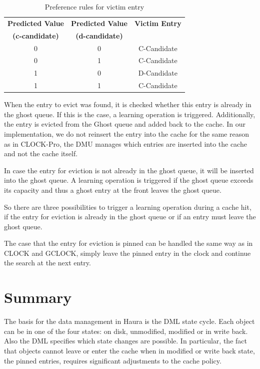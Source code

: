\documentclass[
	12pt,
	a4paper,
	abstract,
	bibliography=totoc,
	chapterprefix,
	headings=openright,
	numbers=endperiod,
	parskip=half,
	twoside,
]{scrreprt}
\begin{document}
\begin{table}[ht]
	\centering
	\begin{tabular}{|c|c|c|}
		\hline
		\textbf{Predicted Value} & \textbf{Predicted Value} & \textbf{Victim Entry} \\
		\textbf{(c-candidate)} & \textbf{(d-candidate)} & \\
		\hline
		0 & 0 & C-Candidate \\
		\hline
		0 & 1 & C-Candidate \\
		\hline
		1 & 0 & D-Candidate \\
		\hline
		1 & 1 & C-Candidate \\
		\hline
	\end{tabular}
	\caption{Preference rules for victim entry \cite{cho2021ml}}
	\label{tab:ml-clock preference rules}
\end{table}


When the entry to evict was found,
it is checked whether this entry is already in the ghost queue.
If this is the case, a learning operation is triggered.
Additionally, the entry is evicted from the Ghost queue and added back to the cache.
In our implementation, we do not reinsert the entry into the cache for the same reason as in CLOCK-Pro, the DMU
manages which entries are inserted into the cache and not the cache itself.

In case the entry for eviction is not already in the ghost queue, it will be inserted into the ghost queue.
A learning operation is triggered if the ghost queue exceeds its capacity and thus a ghost entry at the front leaves the ghost queue.

So there are three possibilities to trigger a learning operation during a cache hit, 
if the entry for eviction is already in the ghost queue or
if an entry must leave the ghost queue.

The case that the entry for eviction is pinned can be handled the same way as in CLOCK and GCLOCK, 
simply leave the pinned entry in the clock and continue the search at the next entry.


\section{Summary}
\label{sec:background summary}

The basis for the data management in Haura is the DML state cycle.
Each object can be in one of the four states: on disk, unmodified, modified or in write back.
Also the DML specifies which state changes are possible.
In particular, the fact that objects cannot leave or enter the cache when in modified or 
write back state, the pinned entries, requires significant adjustments to the cache policy.
\end{document}
